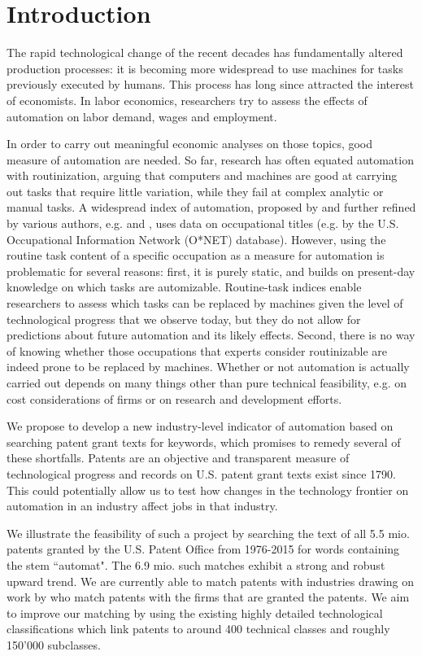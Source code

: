 \documentclass[11pt,a4paper]{article}
\begin{document}
\section{Introduction}
The rapid technological change of the recent decades has fundamentally altered production processes: it is becoming more widespread to use machines for tasks previously executed by humans. This process has long since attracted the interest of economists. In labor economics, researchers try to assess the effects of automation on labor demand, wages and employment. 

In order to carry out meaningful economic analyses on those topics, good measure of automation are needed. So far, research has often equated automation with routinization, arguing that computers and machines are good at carrying out tasks that require little variation, while they fail at complex analytic or manual tasks. A widespread index of automation, proposed by \cite{ALM2003} and further refined by various authors, e.g. \cite{AKK2008} and \cite{AD2013}, uses data on occupational titles (e.g. by the U.S. Occupational Information Network (O*NET) database). However, using the routine task content of a specific occupation as a measure for automation is problematic for several reasons: first, it is purely static, and builds on present-day knowledge on which tasks are automizable. Routine-task indices enable researchers to assess which tasks can be replaced by machines given the level of technological progress that we observe today, but they do not allow for predictions about future automation and its likely effects. Second, there is no way of knowing whether those occupations that experts consider routinizable are indeed prone to be replaced by machines. Whether or not automation is actually carried out depends on many things other than pure technical feasibility, e.g. on cost considerations of firms or on research and development efforts. 

We propose to develop a new industry-level indicator of automation based on searching patent grant texts for keywords, which promises to remedy several of these shortfalls. Patents are an objective and transparent measure of technological progress and records on U.S. patent grant texts exist since 1790. This could potentially allow us to test how changes in the technology frontier on automation in an industry affect jobs in that industry. 

We illustrate the feasibility of such a project by searching the text of all 5.5 mio. patents granted by the U.S. Patent Office from 1976-2015 for words containing the stem ``automat". The 6.9 mio. such matches exhibit a strong and robust upward trend. We are currently able to match patents with industries drawing on work by \cite{HJT2001} who match patents with the firms that are granted the patents. We aim to improve our matching by using the existing highly detailed technological classifications which link patents to around 400 technical classes and roughly 150'000 subclasses. 
\end{document}
